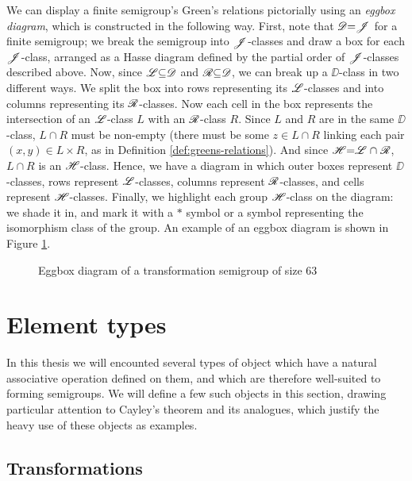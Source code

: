 We can display a finite semigroup's Green's relations pictorially using an
\textit{eggbox diagram}, which is constructed in the following way.  First, note
that $\mathrel{\mathscr{D}} = \mathrel{\mathscr{J}}$ for a finite semigroup; we break the semigroup into
$\mathrel{\mathscr{J}}$-classes and draw a box for each $\mathrel{\mathscr{J}}$-class, arranged as a Hasse diagram
defined by the partial order of $\mathrel{\mathscr{J}}$-classes described above.  Now, since
$\mathrel{\mathscr{L}} \subseteq \mathrel{\mathscr{D}}$ and $\mathrel{\mathscr{R}} \subseteq \mathrel{\mathscr{D}}$, we can break up a $\DD$-class in
two different ways.  We split the box into rows representing its $\mathrel{\mathscr{L}}$-classes
and into columns representing its $\mathrel{\mathscr{R}}$-classes.  Now each cell in the box
represents the intersection of an $\mathrel{\mathscr{L}}$-class $L$ with an $\mathrel{\mathscr{R}}$-class $R$.
Since $L$ and $R$ are in the same $\DD$-class, $L \cap R$ must be non-empty
(there must be some $z \in L \cap R$ linking each pair $(x,y) \in L \times R$,
as in Definition \ref{def:greens-relations}).  And since $\mathrel{\mathscr{H}} = \mathrel{\mathscr{L}} \cap \mathrel{\mathscr{R}}$,
$L \cap R$ is an $\mathrel{\mathscr{H}}$-class.  Hence, we have a diagram in which outer boxes
represent $\DD$-classes, rows represent $\mathrel{\mathscr{L}}$-classes, columns represent
$\mathrel{\mathscr{R}}$-classes, and cells represent $\mathrel{\mathscr{H}}$-classes.  Finally, we highlight each
group $\mathrel{\mathscr{H}}$-class on the diagram: we shade it in, and mark it with a $*$ symbol
or a symbol representing the isomorphism class of the group.  An example of an
eggbox diagram is shown in Figure \ref{fig:eggbox-diagram}.


\begin{figure}[p]
  \centering
  
  \caption{Eggbox diagram of a transformation semigroup of size 63}
  \label{fig:eggbox-diagram}
\end{figure}

\section{Element types}
\label{sec:element-types}

In this thesis we will encounted several types of object which have a natural
associative operation defined on them, and which are therefore well-suited to
forming semigroups.  We will define a few such objects in this section, drawing
particular attention to Cayley's theorem and its analogues, which justify the
heavy use of these objects as examples.

\subsection{Transformations}
\label{sec:transformations}

